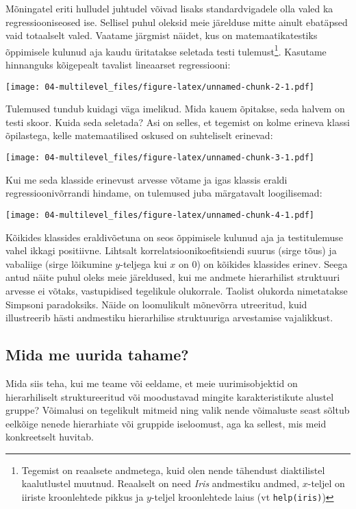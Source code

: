 \documentclass[
]{book}
\begin{document}
Mõningatel eriti hulludel juhtudel võivad lisaks standardvigadele olla valed ka regressiooniseosed ise. Sellisel puhul oleksid meie järelduse mitte ainult ebatäpsed vaid totaalselt valed. Vaatame järgmist näidet, kus on matemaatikatestiks õppimisele kulunud aja kaudu üritatakse seletada testi tulemust\footnote{Tegemist on reaalsete andmetega, kuid olen nende tähendust diaktilistel kaalutlustel muutnud. Reaalselt on need \emph{Iris} andmestiku andmed, \(x\)-teljel on iiriste kroonlehtede pikkus ja \(y\)-teljel kroonlehtede laius (vt \texttt{help(iris)})}. Kasutame hinnanguks kõigepealt tavalist lineaarset regressiooni:

\texttt{[image: 04-multilevel\_files/figure-latex/unnamed-chunk-2-1.pdf]}

Tulemused tundub kuidagi väga imelikud. Mida kauem õpitakse, seda halvem on testi skoor. Kuida seda seletada? Asi on selles, et tegemist on kolme erineva klassi õpilastega, kelle matemaatilised oskused on suhteliselt erinevad:

\texttt{[image: 04-multilevel\_files/figure-latex/unnamed-chunk-3-1.pdf]}

Kui me seda klasside erinevust arvesse võtame ja igas klassis eraldi regressioonivõrrandi hindame, on tulemused juba märgatavalt loogilisemad:

\texttt{[image: 04-multilevel\_files/figure-latex/unnamed-chunk-4-1.pdf]}

Kõikides klassides eraldivõetuna on seos õppimisele kulunud aja ja testitulemuse vahel ikkagi positiivne. Lihtsalt korrelatsioonikoefitsiendi suurus (sirge tõus) ja vabaliige (sirge lõikumine \(y\)-teljega kui \(x\) on 0) on kõikides klassides erinev. Seega antud näite puhul oleks meie järeldused, kui me andmete hierarhilist struktuuri arvesse ei võtaks, vastupidised tegelikule olukorrale. Taolist olukorda nimetatakse Simpsoni paradoksiks. Näide on loomulikult mõnevõrra utreeritud, kuid illustreerib hästi andmestiku hierarhilise struktuuriga arvestamise vajalikkust.

\hypertarget{mida-me-uurida-tahame}{%
\subsection{Mida me uurida tahame?}\label{mida-me-uurida-tahame}}

Mida siis teha, kui me teame või eeldame, et meie uurimisobjektid on hierarhiliselt struktureeritud või moodustavad mingite karakteristikute alustel gruppe? Võimalusi on tegelikult mitmeid ning valik nende võimaluste seast sõltub eelkõige nenede hierarhiate või gruppide iseloomust, aga ka sellest, mis meid konkreetselt huvitab.
\end{document}
